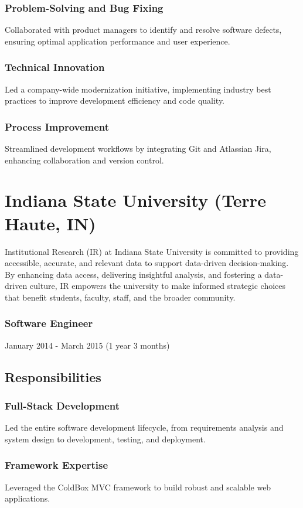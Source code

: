 \documentclass[letterpaper,9pt]{article}
\begin{document}
    \subsubsection{Problem-Solving and Bug Fixing}{Collaborated with product managers to identify and resolve software defects, ensuring optimal application performance and user experience.}
    \subsubsection{Technical Innovation}{Led a company-wide modernization initiative, implementing industry best practices to improve development efficiency and code quality.}
    \subsubsection{Process Improvement}{Streamlined development workflows by integrating Git and Atlassian Jira, enhancing collaboration and version control.}

    \pagebreak


    \section{Indiana State University (Terre Haute, IN)}{
	Institutional Research (IR) at Indiana State University is committed to providing accessible, accurate, and relevant data to support data-driven decision-making. By enhancing data access, delivering insightful analysis, and fostering a data-driven culture, IR empowers the university to make informed strategic choices that benefit students, faculty, staff, and the broader community.}
	\subsubsection{Software Engineer}{January 2014 - March 2015 (1 year 3 months)}
	\subsection{Responsibilities}
	\subsubsection{Full-Stack Development}{Led the entire software development lifecycle, from requirements analysis and system design to development, testing, and deployment.}
	\subsubsection{Framework Expertise}{Leveraged the ColdBox MVC framework to build robust and scalable web applications.}
\end{document}

